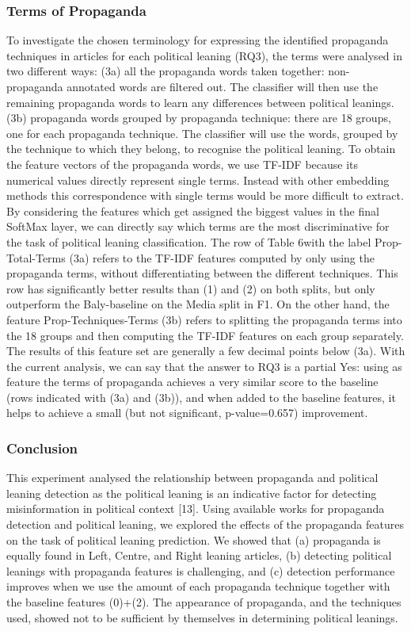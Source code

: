 \subsubsection{Terms of Propaganda}

To investigate the chosen terminology for expressing the identified propaganda techniques in articles for each political leaning (RQ3), the terms were analysed in two different ways:
(3a) all the propaganda words taken together: non-propaganda annotated words are filtered out. The classifier will then use the remaining propaganda words to learn any differences between political leanings.
(3b) propaganda words grouped by propaganda technique: there are 18 groups, one for each propaganda technique. The classifier will use the words, grouped by the technique to which they belong, to recognise the political leaning.
To obtain the feature vectors of the propaganda words, we use TF-IDF because its numerical values directly represent single terms. Instead with other embedding methods  this correspondence with single terms would be more difficult to extract. By considering the features which get assigned the biggest values in the final SoftMax layer, we can directly say which terms are the most discriminative for the task of political leaning classification. 
The row of Table 6with the label Prop-Total-Terms (3a) refers to the TF-IDF features computed by only using the propaganda terms, without differentiating between the different techniques. This row has significantly better results than (1) and (2) on both splits, but only outperform the Baly-baseline on the Media split in F1.
On the other hand, the feature Prop-Techniques-Terms (3b) refers to splitting the propaganda terms into the 18 groups and then computing the TF-IDF features on each group separately. The results of this feature set are generally a few decimal points below (3a).
With the current analysis, we can say that the answer to RQ3 is a partial Yes: using as feature the terms of propaganda achieves a very similar score to the baseline (rows indicated with (3a) and (3b)), and when added to the baseline features, it helps to achieve a small (but not significant, p-value=0.657) improvement.


\subsubsection{Conclusion}

This experiment analysed the relationship between propaganda and political leaning detection as the political leaning is an indicative factor for detecting misinformation in political context [13]. Using available works for propaganda detection and political leaning, we explored the effects of the propaganda features on the task of political leaning prediction. We showed that (a) propaganda is equally found in Left, Centre, and Right leaning articles, (b) detecting political leanings with propaganda features is challenging, and (c) detection performance improves when we use the amount of each propaganda technique together with the baseline features (0)+(2). The appearance of propaganda, and the techniques used, showed not to be sufficient by themselves in determining political leanings.




